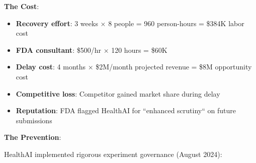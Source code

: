 \textbf{The Cost}:

\begin{itemize}
    \item \textbf{Recovery effort}: 3 weeks $\times$ 8 people = 960 person-hours = \$384K labor cost
    \item \textbf{FDA consultant}: \$500/hr $\times$ 120 hours = \$60K
    \item \textbf{Delay cost}: 4 months $\times$ \$2M/month projected revenue = \$8M opportunity cost
    \item \textbf{Competitive loss}: Competitor gained market share during delay
    \item \textbf{Reputation}: FDA flagged HealthAI for ``enhanced scrutiny`` on future submissions
\end{itemize}

\textbf{The Prevention}:

HealthAI implemented rigorous experiment governance (August 2024):

